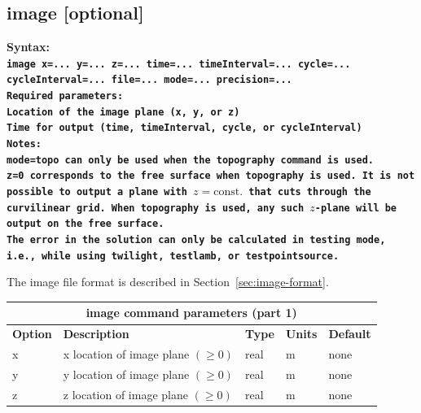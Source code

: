 \documentclass[11pt]{report}
\begin{document}
\subsection{image [optional]}
\label{keyword:image}
\begin{flushleft}
\bf Syntax:\\ \tt image x=... y=... z=...
time=... timeInterval=... cycle=... cycleInterval=... file=... mode=... precision=...\\ \bf Required
parameters:\\ \rm Location of the image plane (x, y, or z) \\ Time for output (time, timeInterval,
cycle, or cycleInterval)\\ \bf Notes: \\ \rm \verb+mode=topo+ can only be used when the
\verb+topography+ command is used.\\ \verb+z=0+ corresponds to the free surface when
\verb+topography+ is used. It is not possible to output a plane with $z=\mbox{const.}$ that cuts
through the curvilinear grid. When \verb+topography+ is used, any such $z$-plane will be output on
the free surface. \\ The error in the solution can only be calculated in testing mode, i.e., while
using \verb+twilight+, \verb+testlamb+, or \verb+testpointsource+.
\end{flushleft}
%
The image file format is described in Section~\ref{sec:image-format}.
%
\begin{center}
\begin{tabular}{|l|p{8cm}|l|l|l|} \hline
\multicolumn{5}{|c|}{\bf image command parameters (part 1)}\\ \hline
\bf{Option} & \bf{Description}                             & \bf{Type} & \bf{Units} & \bf{Default} \\ 
\hline \hline
x          & x location of image plane  $(\geq 0)$    & real    & m        & none \\ \hline
y          & y location of image plane  $(\geq 0)$    & real    & m        & none \\ \hline
z          & z location of image plane  $(\geq 0)$    & real    & m        & none \\ \hline
\end{tabular}
\end{center}
\end{document}
